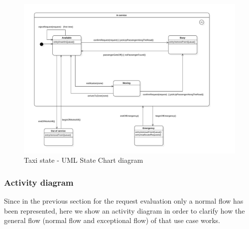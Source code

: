\begin{landscape}
\begin{figure}[H]
\begin{centering}
\includegraphics[bb=20bp 20bp 800bp 575bp,scale=0.6]{specific-requirements/3.6-other-uml/image/state}
\par\end{centering}

\protect\caption{Taxi state - UML State Chart diagram }


\end{figure}


\end{landscape}

\clearpage{}


\subsubsection{Activity diagram}

Since in the previous section for the request evaluation only a normal
flow has been represented, here we show an activity diagram in order
to clarify how the general flow (normal flow and exceptional flow)
of that use case works.

